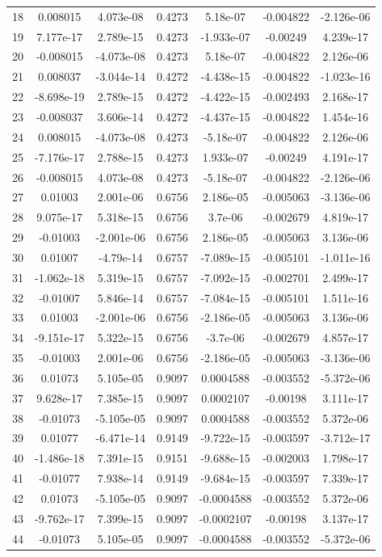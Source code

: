 \documentclass{article}%
\begin{document}
\begin{longtable}{| c | c c c c c c |}
18&0.008015&4.073e{-}08&0.4273&5.18e{-}07&{-}0.004822&{-}2.126e{-}06\\%
19&7.177e{-}17&2.789e{-}15&0.4273&{-}1.933e{-}07&{-}0.00249&4.239e{-}17\\%
20&{-}0.008015&{-}4.073e{-}08&0.4273&5.18e{-}07&{-}0.004822&2.126e{-}06\\%
21&0.008037&{-}3.044e{-}14&0.4272&{-}4.438e{-}15&{-}0.004822&{-}1.023e{-}16\\%
22&{-}8.698e{-}19&2.789e{-}15&0.4272&{-}4.422e{-}15&{-}0.002493&2.168e{-}17\\%
23&{-}0.008037&3.606e{-}14&0.4272&{-}4.437e{-}15&{-}0.004822&1.454e{-}16\\%
24&0.008015&{-}4.073e{-}08&0.4273&{-}5.18e{-}07&{-}0.004822&2.126e{-}06\\%
25&{-}7.176e{-}17&2.788e{-}15&0.4273&1.933e{-}07&{-}0.00249&4.191e{-}17\\%
26&{-}0.008015&4.073e{-}08&0.4273&{-}5.18e{-}07&{-}0.004822&{-}2.126e{-}06\\%
27&0.01003&2.001e{-}06&0.6756&2.186e{-}05&{-}0.005063&{-}3.136e{-}06\\%
28&9.075e{-}17&5.318e{-}15&0.6756&3.7e{-}06&{-}0.002679&4.819e{-}17\\%
29&{-}0.01003&{-}2.001e{-}06&0.6756&2.186e{-}05&{-}0.005063&3.136e{-}06\\%
30&0.01007&{-}4.79e{-}14&0.6757&{-}7.089e{-}15&{-}0.005101&{-}1.011e{-}16\\%
31&{-}1.062e{-}18&5.319e{-}15&0.6757&{-}7.092e{-}15&{-}0.002701&2.499e{-}17\\%
32&{-}0.01007&5.846e{-}14&0.6757&{-}7.084e{-}15&{-}0.005101&1.511e{-}16\\%
33&0.01003&{-}2.001e{-}06&0.6756&{-}2.186e{-}05&{-}0.005063&3.136e{-}06\\%
34&{-}9.151e{-}17&5.322e{-}15&0.6756&{-}3.7e{-}06&{-}0.002679&4.857e{-}17\\%
35&{-}0.01003&2.001e{-}06&0.6756&{-}2.186e{-}05&{-}0.005063&{-}3.136e{-}06\\%
36&0.01073&5.105e{-}05&0.9097&0.0004588&{-}0.003552&{-}5.372e{-}06\\%
37&9.628e{-}17&7.385e{-}15&0.9097&0.0002107&{-}0.00198&3.111e{-}17\\%
38&{-}0.01073&{-}5.105e{-}05&0.9097&0.0004588&{-}0.003552&5.372e{-}06\\%
39&0.01077&{-}6.471e{-}14&0.9149&{-}9.722e{-}15&{-}0.003597&{-}3.712e{-}17\\%
40&{-}1.486e{-}18&7.391e{-}15&0.9151&{-}9.688e{-}15&{-}0.002003&1.798e{-}17\\%
41&{-}0.01077&7.938e{-}14&0.9149&{-}9.684e{-}15&{-}0.003597&7.339e{-}17\\%
42&0.01073&{-}5.105e{-}05&0.9097&{-}0.0004588&{-}0.003552&5.372e{-}06\\%
43&{-}9.762e{-}17&7.399e{-}15&0.9097&{-}0.0002107&{-}0.00198&3.137e{-}17\\%
44&{-}0.01073&5.105e{-}05&0.9097&{-}0.0004588&{-}0.003552&{-}5.372e{-}06\\%
\end{longtable}

%
\end{document}
